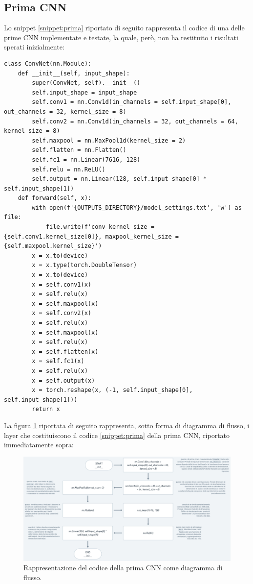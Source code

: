 \documentclass[12pt,italian]{report}
\begin{document}
\subsection{Prima CNN}
\label{subsec:prima}

Lo snippet \ref{snippet:prima} riportato di seguito rappresenta il codice di una delle prime CNN implementate e testate, la quale, però, non ha restituito i risultati sperati inizialmente:

\lstset{language=Python}
\begin{lstlisting}[aboveskip=15pt, belowskip=15pt, basicstyle=\fontsize{8}{10}\selectfont, keywordstyle=\color{blue}, breaklines=true, label=snippet:prima]
class ConvNet(nn.Module):
    def __init__(self, input_shape):
        super(ConvNet, self).__init__()
        self.input_shape = input_shape
        self.conv1 = nn.Conv1d(in_channels = self.input_shape[0], out_channels = 32, kernel_size = 8)
        self.conv2 = nn.Conv1d(in_channels = 32, out_channels = 64, kernel_size = 8)
        self.maxpool = nn.MaxPool1d(kernel_size = 2)
        self.flatten = nn.Flatten()
        self.fc1 = nn.Linear(7616, 128)
        self.relu = nn.ReLU()
        self.output = nn.Linear(128, self.input_shape[0] * self.input_shape[1])
    def forward(self, x):
        with open(f'{OUTPUTS_DIRECTORY}/model_settings.txt', 'w') as file:
            file.write(f'conv_kernel_size = {self.conv1.kernel_size[0]}, maxpool_kernel_size = {self.maxpool.kernel_size}')
        x = x.to(device)
        x = x.type(torch.DoubleTensor)
        x = x.to(device)
        x = self.conv1(x)
        x = self.relu(x)
        x = self.maxpool(x)
        x = self.conv2(x)
        x = self.relu(x)
        x = self.maxpool(x)
        x = self.relu(x)
        x = self.flatten(x)
        x = self.fc1(x)
        x = self.relu(x)
        x = self.output(x)
        x = torch.reshape(x, (-1, self.input_shape[0], self.input_shape[1]))
        return x
\end{lstlisting}

La figura \ref{fig:prima} riportata di seguito rappresenta, sotto forma di diagramma di flusso, i layer che costituiscono il codice \ref{snippet:prima} della prima CNN, riportato immediatamente sopra:

\begin{figure}[H]
    \centering
    \includegraphics[width=1\textwidth]{immagini/prima.png}
    \captionsetup{justification=centering}
    \caption{Rappresentazione del codice della prima CNN come diagramma di flusso.}
    \label{fig:prima}
\end{figure}
\end{document}
